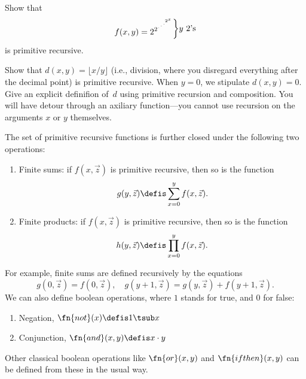 \documentclass[../../../include/open-logic-section]{subfiles}
\begin{document}
\begin{prob}
Show that \[
f(x, y) =
2^{2^{\iddots^{2^{x}}}}\raisebox{1ex}{\bigg\rbrace}
\raisebox{1ex}{\text {$y$ $2$'s}}\] is primitive recursive.
\end{prob}

\begin{prob}
Show that $d(x, y) = \lfloor x/y \rfloor$ (i.e., division, where you
disregard everything after the decimal point) is primitive
recursive. When $y = 0$, we stipulate $d(x, y) = 0$. Give an explicit
definifion of~$d$ using primitive recursion and composition. You will
have detour through an axiliary function---you cannot use recursion on
the arguments $x$ or $y$ themselves.
\end{prob}

The set of primitive recursive functions is further closed under the
following two operations:
\begin{enumerate}
\item Finite sums: if $f(x,\vec z)$ is primitive recursive, then so is the
function
\[
g(y,\vec z) \defis \sum_{x = 0}^y f(x,\vec z).
\]
\item Finite products: if $f(x,\vec z)$ is primitive recursive, then so is the
function
\[
h(y,\vec z) \defis \prod_{x = 0}^y f(x,\vec z).
\]
\end{enumerate}
For example, finite sums are defined recursively by the equations
\[
g(0,\vec z) = f(0,\vec z), \quad g(y+1,\vec z) = g(y,\vec z) +
f(y+1,\vec z).
\]
We can also define boolean operations, where $1$ stands for true, and
$0$ for false:
\begin{enumerate}
\item Negation, $\fn{not}(x) \defis 1 \tsub x$
\item Conjunction, $\fn{and}(x,y) \defis x \cdot y$
\end{enumerate}
Other classical boolean operations like $\fn{or}(x,y)$ and
$\fn{ifthen}(x,y)$ can be defined from these in the usual way.
\end{document}
